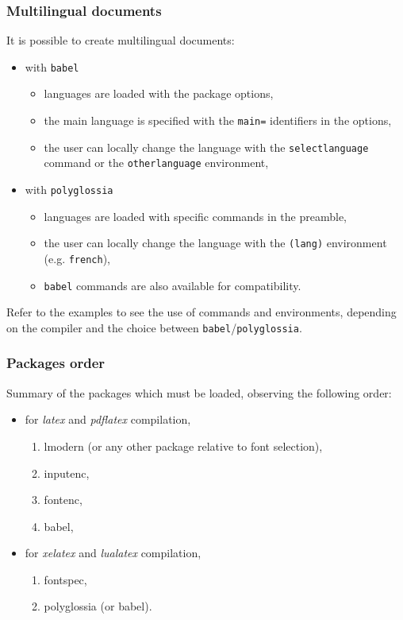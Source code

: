 \documentclass[11pt]{beamer}
\begin{document}
\begin{frame}
	\frametitle{Multilingual documents}
	
	It is possible to create multilingual documents:
	\begin{itemize}
		\item with \texttt{babel}
		\begin{itemize}
			\item languages are loaded with the package options,
			\item the main language is specified with the \texttt{main=} identifiers in the options,
			\item the user can locally change the language with the \texttt{selectlanguage} command or the \texttt{otherlanguage} environment,
		\end{itemize}
		\item with \texttt{polyglossia}
		\begin{itemize}
			\item languages are loaded with specific commands in the preamble,
			\item the user can locally change the language with the \texttt{(lang)} environment (e.g. \texttt{french}),
			\item \texttt{babel} commands are also available for compatibility.
		\end{itemize}
	\end{itemize}

	Refer to the examples to see the use of commands and environments, depending on the compiler and the choice between \texttt{babel}/\texttt{polyglossia}.
\end{frame}


\begin{frame}
	\frametitle{Packages order}
	
	Summary of the packages which must be loaded, observing the following order:
	\begin{itemize}
		\item for \textit{latex} and \textit{pdflatex} compilation,
		\begin{enumerate}
			\item lmodern (or any other package relative to font selection),
			\item inputenc,
			\item fontenc,
			\item babel,
		\end{enumerate}
		\item for \textit{xelatex} and \textit{lualatex} compilation,
		\begin{enumerate}
			\item fontspec,
			\item polyglossia (or babel).
		\end{enumerate}
	\end{itemize}
\end{frame}


  

\end{document}
